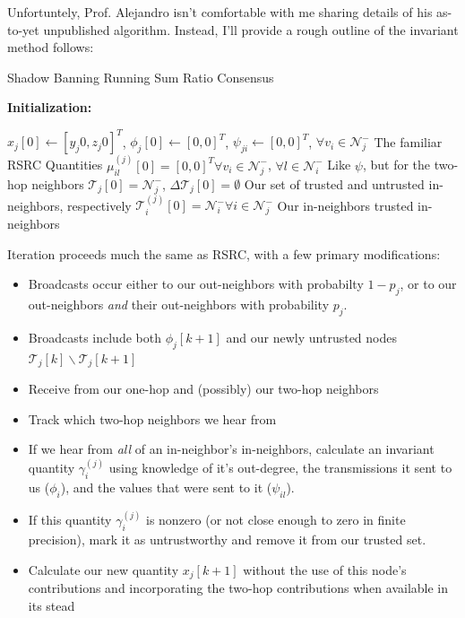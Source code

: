 \documentclass[11pt]{article}
\begin{document}
Unfortuntely, Prof. Alejandro isn't comfortable with me sharing details of his
as-to-yet unpublished algorithm. Instead, I'll provide a rough outline of the
invariant method follows:
\begin{algorithm}
    \caption{Shadow Banning Running Sum Ratio Consensus}
    \textbf{Initialization:}
    \begin{algorithmic}
        \State $x_j[0] \gets [y_j0, z_j0]^T$, $\phi_j[0]\gets[0,0]^T$,
        $\psi_{ji}\gets[0,0]^T$, $\forall v_i\in\mathcal{N}_j^-$
        \Comment The familiar RSRC Quantities
        \State $\mu_{il}^{(j)}[0] = [0,0]^T \forall v_i\in\mathcal{N}_j^-$, $\forall l\in \mathcal{N}_i^-$
        \Comment Like $\psi$, but for the two-hop neighbors
        \State $\mathcal{T}_j[0] = \mathcal{N}_j^-$, $\Delta\mathcal{T}_j[0] = \emptyset$
        \Comment Our set of trusted and untrusted in-neighbors, respectively
        \State $\mathcal{T}_i^{(j)}[0] = \mathcal{N}_i^-\forall i\in\mathcal{N}_j^-$
        \Comment Our in-neighbors trusted in-neighbors
    \end{algorithmic}
\end{algorithm}
Iteration proceeds much the same as RSRC, with a few primary modifications:
\begin{itemize}
    \item Broadcasts occur either to our out-neighbors with probabilty $1-p_j$,
          or to our out-neighbors \textit{and} their out-neighbors with probability
          $p_j$.
    \item Broadcasts include both $\phi_j[k+1]$ and our newly untrusted nodes
          $\mathcal{T}_j[k] \backslash \mathcal{T}_j[k+1]$
    \item Receive from our one-hop and (possibly) our two-hop neighbors
    \item Track which two-hop neighbors we hear from
    \item If we hear from \textit{all} of an in-neighbor's in-neighbors,
          calculate an invariant quantity $\gamma_{i}^{(j)}$ using knowledge of
          it's out-degree, the transmissions it sent to us ($\phi_i$), and the values that
          were sent to it ($\psi_{il}$).
    \item If this quantity $\gamma_{i}^{(j)}$ is nonzero (or not close enough to
          zero in finite precision), mark it as untrustworthy and remove it from our
          trusted set.
    \item Calculate our new quantity $x_j[k+1]$ without the use of this node's
          contributions and incorporating the two-hop contributions when available in
          its stead
\end{itemize}
\end{document}
